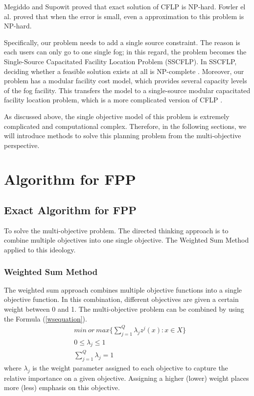 \documentclass[10pt,journal,compsoc]{IEEEtran}
\newcommand{\Eq}[1]{(\ref{#1})}
\begin{document}
Megiddo and Supowit  \cite{1984} proved that exact solution of CFLP is NP-hard. Fowler el al. \cite{FOWLER1981133} proved that when the error is small, even a approximation to this problem is NP-hard.

Specifically, our problem needs to add a single source constraint. The reason is each users can only go to one single fog; in this regard, the problem becomes the Single-Source Capacitated Facility Location Problem (SSCFLP). In SSCFLP, deciding whether a feasible solution exists at all is NP-complete \cite{bonn}.
Moreover, our problem has a modular facility cost model, which provides several capacity levels of the fog facility. This transfers the model to a single-source modular capacitated facility location problem, which is a more complicated version of CFLP \cite{bonn}.

As discussed above, the single objective model of this problem is extremely complicated and computational complex. Therefore, in the following sections, we will introduce methods to solve this planning problem from the multi-objective perspective.

\section{Algorithm for FPP}\label{alfpp}


\subsection{Exact Algorithm for FPP}
To solve the multi-objective problem. The directed thinking approach is to combine multiple objectives into one single objective. The Weighted Sum Method applied to this ideology.
\subsubsection{Weighted Sum Method}
The weighted sum approach combines multiple objective functions into a single objective function. In this combination, different objectives are given a certain weight between 0 and 1. The multi-objective problem can be combined by using the Formula \Eq{wsequation}.
\begin{align}%
&min\ or\ max \bigg\{\sum_{j=1}^Q \lambda_j z^j (x) : x \in X \bigg\}\label{wsequation}\\
&0\leq \lambda_j \leq 1\\
&\sum_{j=1}^Q \lambda_j = 1
\end{align}
where $\lambda_j$ is the weight parameter assigned to each objective to capture the relative importance on a given objective. Assigning a higher (lower) weight places more (less) emphasis on this objective.
\end{document}
